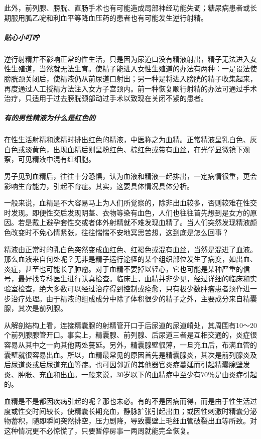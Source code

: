 \begin{enumerate}
此外，前列腺、膀胱、直肠手术也有可能造成局部神经功能失调；糖尿病患者或长期服用胍乙啶和利血平等降血压药的患者也有可能发生逆行射精。

\subparagraph{贴心小叮咛}

逆行射精并不影响正常的性生活，只是因为尿道口没有精液射出，精子无法进入女性生殖道，当然就无法生育。使精子能进入女性生殖道的办法有两种：一是设法使膀胱颈关闭后，使精液仍从前尿道口射出；另一种是将进入膀胱的精子收集起来，再度通过人工授精方法注入女方子宫颈内。前一种恢复顺行射精的办法可通过手术治疗，只适用于过去膀胱颈部动过手术以致现在关闭不紧的患者。

\subparagraph{有的男性精液为什么是红色的}

在性生活射精和遗精时排出红色的精液，中医称之为血精。正常精液呈乳白色、灰白色或淡黄色，出现血精后则呈粉红色、棕红色或带有血丝，在光学显微镜下观察，可见精液中混有红细胞。

男子见到血精后，往往十分恐惧，认为血液和精液一起排出，一定病情很重，更会影响生育能力，引起不育症。其实，这要具体情况具体分析。

一般来说，血精是不大容易马上为人们所觉察的，除非出血较多，否则较难在性交时发现。即便性交后发现阴茎、衣物等染有血色，人们也往往首先想到是女方的原因。若是戴上避孕套性交或者体外射精就不难发现血精了。当人们突然发现精液颜色改变时不免心情紧张，往往惴惴不安地冥思苦想，这到底是怎么回事？

精液由正常时的乳白色突然变成血红色、红褐色或混有血丝，当然是混进了血液。那么血液来自何处呢？无非是精子运行途径的某个组织部位发生了病变，如出血、炎症，甚至也可能长了肿瘤。对于血精不要掉以轻心，它也可能是某种严重的信号，最好找专科医生进行认真检查。临床上，血精并非少见，经过详细的临床和实验室检查，绝大多数可以经过治疗得到控制或痊愈，只有极少数肿瘤患者须作进一步治疗处理。由于精液的组成成分中除了体积很少的精子之外，主要成分来自精囊腺，其次是前列腺。

从解剖结构上看，连接精囊腺的射精管开口于后尿道的尿道嵴处，其周围有10～20个前列腺腺管开口。事实上，精囊腺、前列腺、后尿道三者是互相交通的，炎症很容易从其中之一向其他两处蔓延。另外，精囊腺壁很薄，一旦充血后，布满血管的囊壁就很容易出血。所以，血精最常见的原因首先是精囊腺炎，其次是前列腺炎及后尿道炎或后尿道充血等症。也可因邻近的其他器官炎症蔓延而引起精囊腺壁发炎、肿胀、充血和出血。一般来说，30岁以下的血精症中至少有70％是由炎症引起的。

血精是不是都因疾病引起的呢？那也未必。有的不是因病而得，而是由于性生活过度或性交时间较长，使精囊长期充血，静脉扩张引起出血；或因性刺激时精囊分泌物蓄积，随即瞬间突然排空，压力剧降，导致囊壁上毛细血管破裂出血等所致。对这种情况更不必惊慌了，只要暂停房事一两周就能完全恢复。


\end{enumerate}

